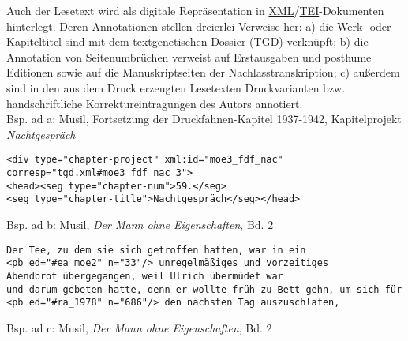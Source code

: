 \documentclass{article}
\begin{document}
        Auch der Lesetext wird als digitale Repräsentation in \href{http://gams.uni-graz.at/o:konde.215}{XML}/\href{http://gams.uni-graz.at/o:konde.178}{TEI}-Dokumenten hinterlegt. Deren Annotationen stellen dreierlei Verweise
                  her: a) die Werk- oder Kapiteltitel sind mit dem textgenetischen Dossier (TGD)
                  verknüpft; b) die Annotation von Seitenumbrüchen verweist auf Erstausgaben und
                  posthume Editionen sowie auf die Manuskriptseiten der Nachlasstranskription; c)
                  außerdem sind in den aus dem Druck erzeugten Lesetexten Druckvarianten bzw.
                  handschriftliche Korrektureintragungen des Autors annotiert.\\
            
        Bsp. ad a: Musil, Fortsetzung der Druckfahnen-Kapitel 1937-1942, Kapitelprojekt
                     \emph{Nachtgespräch}\\
            
        \begin{verbatim}<div type="chapter-project" xml:id="moe3_fdf_nac"
corresp="tgd.xml#moe3_fdf_nac_3">
<head><seg type="chapter-num">59.</seg>
<seg type="chapter-title">Nachtgespräch</seg></head>\end{verbatim}Bsp. ad b: Musil, \emph{Der Mann ohne Eigenschaften}, Bd. 2\\
            
        \begin{verbatim}Der Tee, zu dem sie sich getroffen hatten, war in ein
<pb ed="#ea_moe2" n="33"/> unregelmäßiges und vorzeitiges 
Abendbrot übergegangen, weil Ulrich übermüdet war
und darum gebeten hatte, denn er wollte früh zu Bett gehn, um sich für
<pb ed="#ra_1978" n="686"/> den nächsten Tag auszuschlafen,\end{verbatim}Bsp. ad c: Musil, \emph{Der Mann ohne Eigenschaften}, Bd. 2\\
            
\end{document}
